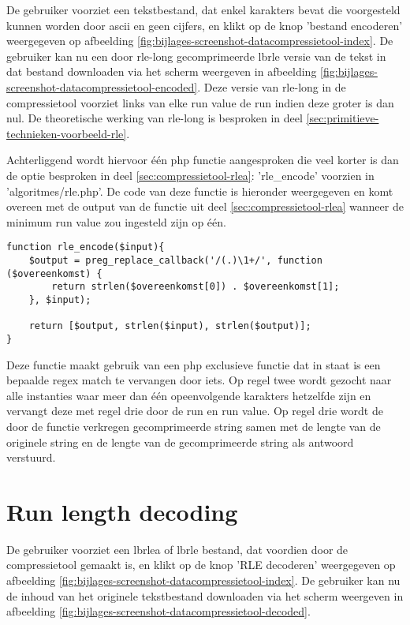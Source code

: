 De gebruiker voorziet een tekstbestand, dat enkel karakters bevat die voorgesteld kunnen worden door \gls{ascii} en geen cijfers, en klikt op de knop 'bestand encoderen' weergegeven op afbeelding \ref{fig:bijlages-screenshot-datacompressietool-index}. De gebruiker kan nu een door \gls{rle-long} gecomprimeerde \gls{lbrle} versie van de tekst in dat bestand downloaden via het scherm weergeven in afbeelding \ref{fig:bijlages-screenshot-datacompressietool-encoded}. Deze versie van \gls{rle-long} in de \gls{compressietool} voorziet links van elke run value de run indien deze groter is dan nul. De theoretische werking van \gls{rle-long} is besproken in deel \ref{sec:primitieve-technieken-voorbeeld-rle}.

Achterliggend wordt hiervoor één \gls{php} functie aangesproken die veel korter is dan de optie besproken in deel \ref{sec:compressietool-rlea}: 'rle\_encode' voorzien in 'algoritmes/rle.php'. De code van deze functie is hieronder weergegeven en komt overeen met de output van de functie uit deel \ref{sec:compressietool-rlea} wanneer de minimum run value zou ingesteld zijn op één.

\begin{lstlisting}
function rle_encode($input){
	$output = preg_replace_callback('/(.)\1+/', function ($overeenkomst) {
		return strlen($overeenkomst[0]) . $overeenkomst[1];
	}, $input);
	
	return [$output, strlen($input), strlen($output)];
}
\end{lstlisting}

Deze functie maakt gebruik van een \gls{php} exclusieve functie dat in staat is een bepaalde \gls{regex} match te vervangen door iets. Op regel twee wordt gezocht naar alle instanties waar meer dan één opeenvolgende karakters hetzelfde zijn en vervangt deze met regel drie door de run en run value. Op regel drie wordt de door de functie verkregen gecomprimeerde \gls{string} samen met de lengte van de originele \gls{string} en de lengte van de gecomprimeerde \gls{string} als antwoord verstuurd.

\section{Run length decoding}
\label{sec:compressietool-rle-decoding}

De gebruiker voorziet een \gls{lbrlea} of \gls{lbrle} bestand, dat voordien door de \gls{compressietool} gemaakt is, en klikt op de knop 'RLE decoderen' weergegeven op afbeelding \ref{fig:bijlages-screenshot-datacompressietool-index}. De gebruiker kan nu de inhoud van het originele tekstbestand downloaden via het scherm weergeven in afbeelding \ref{fig:bijlages-screenshot-datacompressietool-decoded}.

